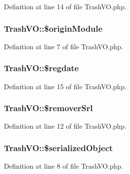 Definition at line 14 of file Trash\+V\+O.\+php.

\hypertarget{classTrashVO_ad977787e04708af64f4c9d4891d3f682}{
\subsubsection[{\$origin\+Module}]{\setlength{\rightskip}{0pt plus 5cm}Trash\+V\+O\+::\$origin\+Module}}\label{classTrashVO_ad977787e04708af64f4c9d4891d3f682}


Definition at line 7 of file Trash\+V\+O.\+php.

\hypertarget{classTrashVO_a54388f0f415f3e5c302eec871e790434}{
\subsubsection[{\$regdate}]{\setlength{\rightskip}{0pt plus 5cm}Trash\+V\+O\+::\$regdate}}\label{classTrashVO_a54388f0f415f3e5c302eec871e790434}


Definition at line 15 of file Trash\+V\+O.\+php.

\hypertarget{classTrashVO_aa51410763a3b44a76853d8a347793903}{
\subsubsection[{\$remover\+Srl}]{\setlength{\rightskip}{0pt plus 5cm}Trash\+V\+O\+::\$remover\+Srl}}\label{classTrashVO_aa51410763a3b44a76853d8a347793903}


Definition at line 12 of file Trash\+V\+O.\+php.

\hypertarget{classTrashVO_ac3834ed43d01357398d5a0d7f5a9c698}{
\subsubsection[{\$serialized\+Object}]{\setlength{\rightskip}{0pt plus 5cm}Trash\+V\+O\+::\$serialized\+Object}}\label{classTrashVO_ac3834ed43d01357398d5a0d7f5a9c698}


Definition at line 8 of file Trash\+V\+O.\+php.

